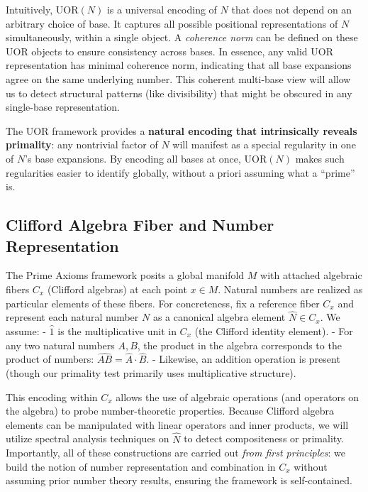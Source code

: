 \documentclass[11pt]{article}
\begin{document}
Intuitively, $\mathrm{UOR}(N)$ is a universal encoding of $N$ that does not depend on an arbitrary choice of base. It captures all possible positional representations of $N$ simultaneously, within a single object. A \emph{coherence norm} can be defined on these UOR objects to ensure consistency across bases. In essence, any valid UOR representation has minimal coherence norm, indicating that all base expansions agree on the same underlying number. This coherent multi-base view will allow us to detect structural patterns (like divisibility) that might be obscured in any single-base representation.

\begin{remark}
The UOR framework provides a \textbf{natural encoding that intrinsically reveals primality}: any nontrivial factor of $N$ will manifest as a special regularity in one of $N$'s base expansions. By encoding all bases at once, $\mathrm{UOR}(N)$ makes such regularities easier to identify globally, without a priori assuming what a “prime” is.
\end{remark}

\subsection{Clifford Algebra Fiber and Number Representation}
The Prime Axioms framework posits a global manifold $M$ with attached algebraic fibers $C_x$ (Clifford algebras) at each point $x\in M$. Natural numbers are realized as particular elements of these fibers. For concreteness, fix a reference fiber $C_x$ and represent each natural number $N$ as a canonical algebra element $\hat{N}\in C_x$. We assume:
- $\hat{1}$ is the multiplicative unit in $C_x$ (the Clifford identity element).
- For any two natural numbers $A,B$, the product in the algebra corresponds to the product of numbers: $\widehat{AB} = \hat{A}\cdot \hat{B}$.
- Likewise, an addition operation is present (though our primality test primarily uses multiplicative structure).

This encoding within $C_x$ allows the use of algebraic operations (and operators on the algebra) to probe number-theoretic properties. Because Clifford algebra elements can be manipulated with linear operators and inner products, we will utilize spectral analysis techniques on $\hat{N}$ to detect compositeness or primality. Importantly, all of these constructions are carried out \emph{from first principles}: we build the notion of number representation and combination in $C_x$ without assuming prior number theory results, ensuring the framework is self-contained.
\end{document}
